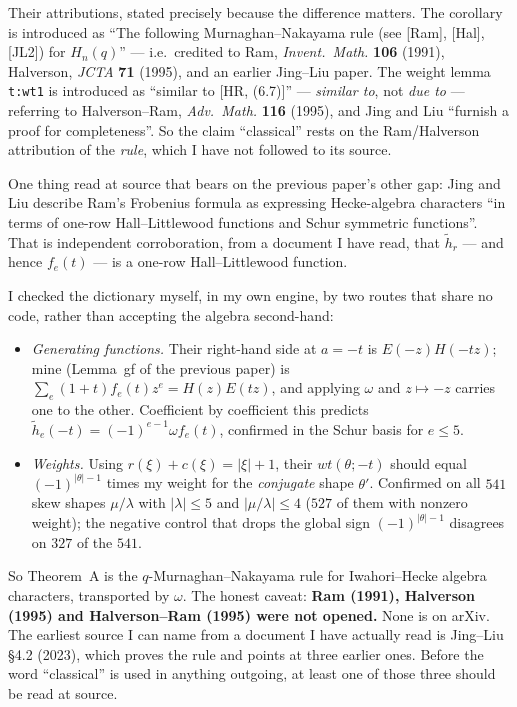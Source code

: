 \documentclass[11pt]{article}
\theoremstyle{definition}
\begin{document}
Their attributions, stated precisely because the difference matters. The corollary is introduced
as ``The following Murnaghan--Nakayama rule (see [Ram], [Hal], [JL2]) for $H_n(q)$'' --- i.e.\
credited to Ram, \emph{Invent.\ Math.} \textbf{106} (1991), Halverson, \emph{JCTA} \textbf{71}
(1995), and an earlier Jing--Liu paper. The weight lemma \texttt{t:wt1} is introduced as
``similar to [HR, (6.7)]'' --- \emph{similar to}, not \emph{due to} --- referring to
Halverson--Ram, \emph{Adv.\ Math.} \textbf{116} (1995), and Jing and Liu ``furnish a proof for
completeness''. So the claim ``classical'' rests on the Ram/Halverson attribution of the
\emph{rule}, which I have not followed to its source.

One thing read at source that bears on the previous paper's other gap: Jing and Liu describe
Ram's Frobenius formula as expressing Hecke-algebra characters ``in terms of one-row
Hall--Littlewood functions and Schur symmetric functions''. That is independent corroboration,
from a document I have read, that $\tilde h_r$ --- and hence $f_e(t)$ --- is a one-row
Hall--Littlewood function.

I checked the dictionary myself, in my own engine, by two routes that share no code, rather than
accepting the algebra second-hand:
\begin{itemize}
\item \emph{Generating functions.} Their right-hand side at $a=-t$ is $E(-z)H(-tz)$; mine
(Lemma~gf of the previous paper) is $\sum_e(1+t)f_e(t)z^e=H(z)E(tz)$, and applying $\omega$ and
$z\mapsto-z$ carries one to the other. Coefficient by coefficient this predicts
$\tilde h_e(-t)=(-1)^{e-1}\omega f_e(t)$, confirmed in the Schur basis for $e\le5$.
\item \emph{Weights.} Using $r(\xi)+c(\xi)=|\xi|+1$, their $wt(\theta;-t)$ should equal
$(-1)^{|\theta|-1}$ times my weight for the \emph{conjugate} shape $\theta'$. Confirmed on all
$541$ skew shapes $\mu/\lambda$ with $|\lambda|\le5$ and $|\mu/\lambda|\le4$ ($527$ of them with
nonzero weight); the negative control that drops the global sign $(-1)^{|\theta|-1}$ disagrees on
$327$ of the $541$.
\end{itemize}
So Theorem~A is the $q$-Murnaghan--Nakayama rule for Iwahori--Hecke algebra characters,
transported by $\omega$. The honest caveat: \textbf{Ram (1991), Halverson (1995) and
Halverson--Ram (1995) were not opened.} None is on arXiv. The earliest source I can name from a
document I have actually read is Jing--Liu \S4.2 (2023), which proves the rule and points at
three earlier ones. Before the word ``classical'' is used in anything outgoing, at least one of
those three should be read at source.
\end{document}
